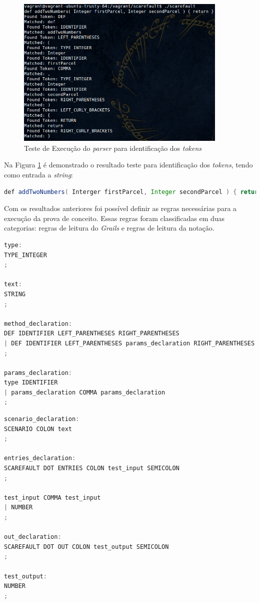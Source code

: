  \begin{figure}[h]
    \centering
    \includegraphics[width=0.9\textwidth]{figuras/second-test-grammar.png}
    \caption{Teste de Execução do \textit{parser} para identificação dos \textit{tokens}}
    \label{fig:test-tokens}
 \end{figure}
\par
\indent Na Figura \ref{fig:test-tokens} é demonstrado o resultado teste para identificação dos \textit{tokens}, tendo como entrada a \textit{string}:
\par
\begin{lstlisting}[language=java, label=string-entry, caption=\textit{string} de entrada]
def addTwoNumbers( Interger firstParcel, Integer secondParcel ) { return }
\end{lstlisting}
\par
\indent Com os resultados anteriores foi possível definir as regras necessárias para a execução da prova de conceito. Essas regras foram classificadas em duas categorias: regras de leitura do \textit{Grails} e regras de leitura da notação.
\par
\begin{lstlisting}[language=C++, label=rules-grails, caption=Regras de Leitura do \textit{Grails}]
type:
TYPE_INTEGER
;

text:
STRING
;

method_declaration:
DEF IDENTIFIER LEFT_PARENTHESES RIGHT_PARENTHESES
| DEF IDENTIFIER LEFT_PARENTHESES params_declaration RIGHT_PARENTHESES
;

params_declaration:
type IDENTIFIER
| params_declaration COMMA params_declaration
;
\end{lstlisting}
\par 
\begin{lstlisting}[language=C++, label=rules-scarefault, caption=Regras de Leitura da notação]
scenario_declaration:
SCENARIO COLON text
;

entries_declaration:
SCAREFAULT DOT ENTRIES COLON test_input SEMICOLON
;

test_input COMMA test_input
| NUMBER
;

out_declaration:
SCAREFAULT DOT OUT COLON test_output SEMICOLON
;

test_output:
NUMBER
;
\end{lstlisting}
